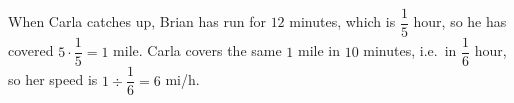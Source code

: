 When Carla catches up, Brian has run for $12$ minutes, which is $\dfrac{1}{5}$ hour, so he has covered $5\cdot\dfrac{1}{5}=1$ mile. Carla covers the same $1$ mile in $10$ minutes, i.e.\ in $\dfrac{1}{6}$ hour, so her speed is $1\div\dfrac{1}{6}=\boxed{6}$ mi/h.
